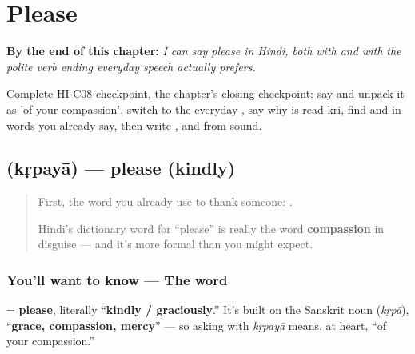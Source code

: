 
\chapter{Please}
\label{ch:hi-please}

\begin{chapteropening}
\textbf{By the end of this chapter:} \emph{I can say please in Hindi, both with  and with the polite verb ending everyday speech actually prefers.}

Complete HI-C08-checkpoint, the chapter's closing checkpoint: say  and unpack it as 'of your compassion', switch to the everyday , say why  is read kri, find  and  in words you already say, then write ,  and  from sound.
\end{chapteropening}

\section[\texorpdfstring{\hi{कृपया} (kṛpayā)}{कृपया (kṛpayā)}]{ (kṛpayā) — please (kindly)}

\label{lesson:HI-C08-kripaya}



\begin{quote}
First, the word you already use to thank someone: \textbf{}.

Hindi's dictionary word for \textquotedblleft{}please\textquotedblright{} is really the word \textbf{compassion} in disguise — and it's more formal than you might expect.
\end{quote}

\subsection*{You'll want to know — The word}
\textbf{} = \textbf{please}, literally \textquotedblleft{}\textbf{kindly / graciously}.\textquotedblright{} It's built on the Sanskrit noun \textbf{} (\emph{kṛpā}), \textquotedblleft{}\textbf{grace, compassion, mercy}\textquotedblright{} — so asking with \emph{kṛpayā} means, at heart, \textquotedblleft{}of your compassion.\textquotedblright{}

